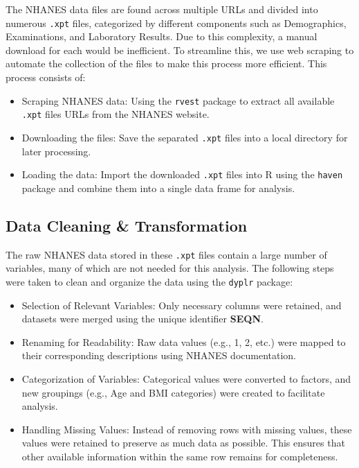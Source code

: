 \documentclass[
]{article}
\providecommand{\tightlist}{%
  \setlength{\itemsep}{0pt}\setlength{\parskip}{0pt}}
\begin{document}
The NHANES data files are found across multiple URLs and divided into
numerous \texttt{.xpt} files, categorized by different components such
as Demographics, Examinations, and Laboratory Results. Due to this
complexity, a manual download for each would be inefficient. To
streamline this, we use web scraping to automate the collection of the
files to make this process more efficient. This process consists of:

\begin{itemize}
\tightlist
\item
  Scraping NHANES data: Using the \texttt{rvest} package to extract all
  available \texttt{.xpt} files URLs from the NHANES website.
\item
  Downloading the files: Save the separated \texttt{.xpt} files into a
  local directory for later processing.
\item
  Loading the data: Import the downloaded \texttt{.xpt} files into R
  using the \texttt{haven} package and combine them into a single data
  frame for analysis.
\end{itemize}

\subsection{Data Cleaning \&
Transformation}\label{data-cleaning-transformation}

The raw NHANES data stored in these \texttt{.xpt} files contain a large
number of variables, many of which are not needed for this analysis. The
following steps were taken to clean and organize the data using the
\texttt{dyplr} package:

\begin{itemize}
\tightlist
\item
  Selection of Relevant Variables: Only necessary columns were retained,
  and datasets were merged using the unique identifier \textbf{SEQN}.
\item
  Renaming for Readability: Raw data values (e.g., 1, 2, etc.) were
  mapped to their corresponding descriptions using NHANES documentation.
\item
  Categorization of Variables: Categorical values were converted to
  factors, and new groupings (e.g., Age and BMI categories) were created
  to facilitate analysis.
\item
  Handling Missing Values: Instead of removing rows with missing values,
  these values were retained to preserve as much data as possible. This
  ensures that other available information within the same row remains
  for completeness.
\end{itemize}
\end{document}
